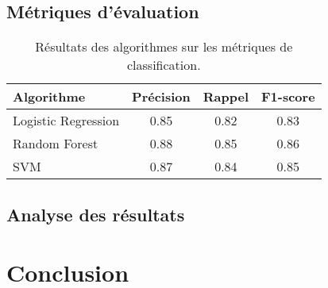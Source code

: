 \documentclass[11pt]{article}
\begin{document}
\subsection{Métriques d'évaluation}
\begin{table}[ht]
    \centering
    \begin{tabular}{lccc}
        \toprule
        \textbf{Algorithme} & \textbf{Précision} & \textbf{Rappel} & \textbf{F1-score} \\ \midrule
        Logistic Regression & 0.85               & 0.82            & 0.83              \\
        Random Forest       & 0.88               & 0.85            & 0.86              \\
        SVM                 & 0.87               & 0.84            & 0.85              \\ \bottomrule
    \end{tabular}
    \caption{Résultats des algorithmes sur les métriques de classification.}
    \label{tab:resultats_algo}
\end{table}

\subsection{Analyse des résultats}


\section{Conclusion}



\cite{forest2009variation}
\end{document}
